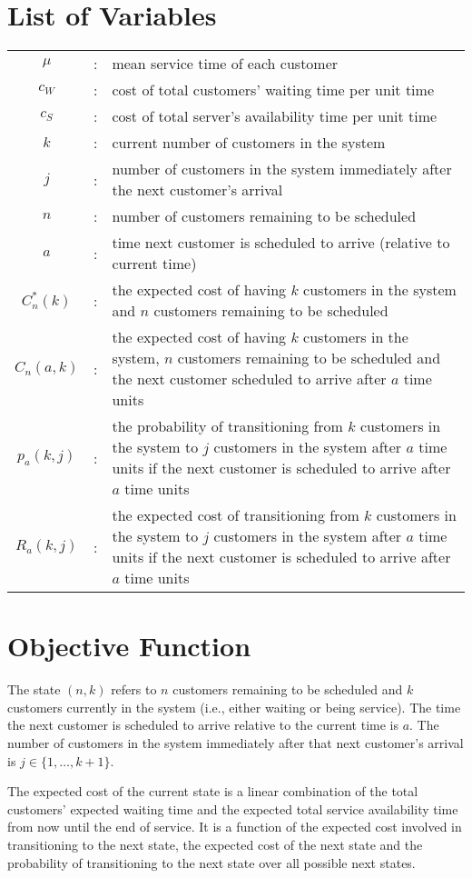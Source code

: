 \section{List of Variables}
\begin{tabularx}{\textwidth}{c c X}
	$\mu$ & : & mean service time of each customer \\
	$c_{W}$ & : & cost of total customers' waiting time per unit time \\
	$c_{S}$ & : & cost of total server's availability time per unit time \\
	$k$ & : & current number of customers in the system \\
	$j$ & : & number of customers in the system immediately after the next customer's arrival \\
	$n$ & : & number of customers remaining to be scheduled \\
	$a$ & : & time next customer is scheduled to arrive (relative to current time) \\
	$C_{n}^{*} (k)$ & : & the expected cost of having $k$ customers in the system and $n$ customers remaining to be scheduled \\
	$C_{n} (a, k)$ & : & the expected cost of having $k$ customers in the system, $n$ customers remaining to be scheduled and the next customer scheduled to arrive after $a$ time units \\
	$p_{a} (k, j)$ & : & the probability of transitioning from $k$ customers in the system to $j$ customers in the system after $a$ time units if the next customer is scheduled to arrive after $a$ time units \\
	$R_{a} (k, j)$ & : & the expected cost of transitioning from $k$ customers in the system to $j$ customers in the system after $a$ time units if the next customer is scheduled to arrive after $a$ time units
\end{tabularx}

\section{Objective Function}
The state $(n, k)$ refers to $n$ customers remaining to be scheduled and $k$ customers currently in the system (i.e., either waiting or being service). The time the next customer is scheduled to arrive relative to the current time is $a$. The number of customers in the system immediately after that next customer's arrival is $j \in \{ 1, \ldots, k + 1 \}$.

The expected cost of the current state is a linear combination of the total customers' expected waiting time and the expected total service availability time from now until the end of service. It is a function of the expected cost involved in transitioning to the next state, the expected cost of the next state and the probability of transitioning to the next state over all possible next states. 

